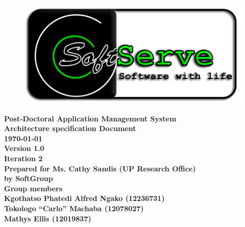 \documentclass[12pt]{article}
\newcommand{\Title}{Architecture specification Document} %
\newcommand{\ssr}{Soft\color{green}{Serve }\color{black}}
\newcommand{\version}{1.0}
\newcommand{\iteration}{2}
\newcommand{\client}{Ms. Cathy Sandis (UP Research Office)}
\newcommand{\project}{Post-Doctoral Application Management System}
\begin{document}
\vspace{4em}

\begin{center}%

\begin{figure}[ht!]
\centering
\includegraphics{../Images_Docs/logo.png}
\end{figure}
\LARGE \bf \project \\[1em]
\LARGE \bf \Title \\[0.25em]
\large \bf \today\\
\bf Version \version\\
\bf Iteration \iteration\\[0.5em]
\Large \bf Prepared for \client\\
\Large \bf by
\Large {\bf \ssr Group }\\[0.5em]
\LARGE {\bf Group members}\\[0.25em]
\large
Kgothatso Phatedi Alfred Ngako (12236731) \\[0.5em]
Tokologo “Carlo” Machaba (12078027) \\[0.5em]
Mathys Ellis (12019837) \\[8em]

\end{center}%

\end{document}
